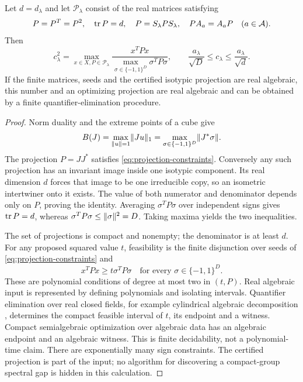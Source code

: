 \begin{theorem}\label{thm:calibration}
Let $d=d_\lambda$ and let $\mathscr P_\lambda$ consist of the real matrices satisfying
\begin{equation}\label{eq:projection-constraints}
 P=P^T=P^2,
 \quad\operatorname{tr} P=d,
 \quad P=S_\lambda P S_\lambda,
 \quad PA_a=A_aP\quad(a\in\mathcal A).
\end{equation}
Then
\begin{equation}\label{eq:projection-calibration}
 c_\lambda^2=\max_{x\in X,P\in\mathscr P_\lambda}
 \frac{x^TPx}{\max_{\sigma\in\{-1,1\}^D}\sigma^TP\sigma},
 \qquad \frac{a_\lambda}{\sqrt D}\le c_\lambda\le\frac{a_\lambda}{\sqrt d}.
\end{equation}
If the finite matrices, seeds and the certified isotypic projection are real algebraic, this number and an optimizing projection are real algebraic and can be obtained by a finite quantifier-elimination procedure.
\end{theorem}
\begin{proof}
Norm duality and the extreme points of a cube give
\begin{equation}\label{eq:sign-norm}
 B(J)=\max_{\lVert u\rVert=1}\lVert Ju\rVert_1
     =\max_{\sigma\in\{-1,1\}^D}\lVert J^*\sigma\rVert.
\end{equation}
The projection $P=JJ^*$ satisfies \eqref{eq:projection-constraints}. Conversely any such projection has an invariant image inside one isotypic component. Its real dimension $d$ forces that image to be one irreducible copy, so an isometric intertwiner onto it exists. The value of both numerator and denominator depends only on $P$, proving the identity. Averaging $\sigma^TP\sigma$ over independent signs gives $\operatorname{tr} P=d$, whereas $\sigma^TP\sigma\le\lVert\sigma\rVert^2=D$. Taking maxima yields the two inequalities.

The set of projections is compact and nonempty; the denominator is at least $d$. For any proposed squared value $t$, feasibility is the finite disjunction over seeds of \eqref{eq:projection-constraints} and
\begin{equation}\label{eq:calibration-feasibility}
 x^TPx\ge t\sigma^TP\sigma
       \quad\text{for every }\sigma\in\{-1,1\}^D.
\end{equation}
These are polynomial conditions of degree at most two in $(t,P)$. Real algebraic input is represented by defining polynomials and isolating intervals. Quantifier elimination over real closed fields, for example cylindrical algebraic decomposition \cite{BPR}, determines the compact feasible interval of $t$, its endpoint and a witness. Compact semialgebraic optimization over algebraic data has an algebraic endpoint and an algebraic witness. This is finite decidability, not a polynomial-time claim. There are exponentially many sign constraints. The certified projection is part of the input; no algorithm for discovering a compact-group spectral gap is hidden in this calculation.
\end{proof}

